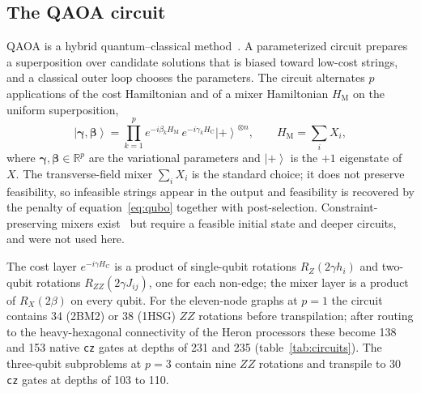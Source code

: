 \documentclass{iopjournal}
\newcommand{\ket}[1]{\left|#1\right\rangle}
\newcommand{\Hc}{H_{\mathrm{C}}}
\newcommand{\Hm}{H_{\mathrm{M}}}
\begin{document}
\subsection{The QAOA circuit}
\label{sec:qaoa}
QAOA is a hybrid quantum--classical method~\cite{farhi2014qaoa,zhou2020qaoa}. A parameterized circuit prepares a superposition over candidate solutions that is biased toward low-cost strings, and a classical outer loop chooses the parameters. The circuit alternates $p$ applications of the cost Hamiltonian and of a mixer Hamiltonian $\Hm$ on the uniform superposition,
\begin{equation}
\label{eq:qaoa}
\ket{\boldsymbol{\gamma},\boldsymbol{\beta}} = \prod_{k=1}^{p} e^{-i\beta_k \Hm}\, e^{-i\gamma_k \Hc} \ket{+}^{\otimes n}, \qquad \Hm = \sum_{i} X_i ,
\end{equation}
where $\boldsymbol{\gamma}, \boldsymbol{\beta} \in \mathbb{R}^p$ are the variational parameters and $\ket{+}$ is the $+1$ eigenstate of $X$. The transverse-field mixer $\sum_i X_i$ is the standard choice; it does not preserve feasibility, so infeasible strings appear in the output and feasibility is recovered by the penalty of equation~\eqref{eq:qubo} together with post-selection. Constraint-preserving mixers exist~\cite{hadfield2019qaoa} but require a feasible initial state and deeper circuits, and were not used here.

The cost layer $e^{-i\gamma\Hc}$ is a product of single-qubit rotations $R_Z(2\gamma h_i)$ and two-qubit rotations $R_{ZZ}(2\gamma J_{ij})$, one for each non-edge; the mixer layer is a product of $R_X(2\beta)$ on every qubit. For the eleven-node graphs at $p=1$ the circuit contains 34 (2BM2) or 38 (1HSG) $ZZ$ rotations before transpilation; after routing to the heavy-hexagonal connectivity of the Heron processors these become 138 and 153 native \texttt{cz} gates at depths of 231 and 235 (table~\ref{tab:circuits}). The three-qubit subproblems at $p=3$ contain nine $ZZ$ rotations and transpile to 30 \texttt{cz} gates at depths of 103 to 110.
\end{document}
